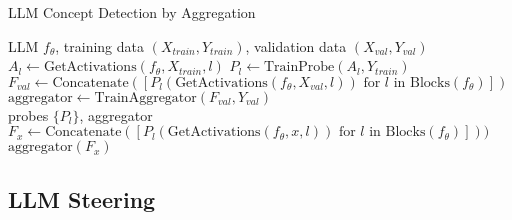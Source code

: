 \begin{algorithm}[h]
\caption{LLM Concept Detection by Aggregation}
\label{alg: aggregation}
\begin{algorithmic}[1]
\Require LLM $f_\theta$, training data $(X_{train}, Y_{train})$, validation data $(X_{val}, Y_{val})$
        \State $A_l \gets \text{GetActivations}(f_\theta, X_{train}, l)$
        \State $P_l \gets \text{TrainProbe}(A_l, Y_{train})$ 
    \EndFor
    \State $F_{val} \gets \text{Concatenate}([P_l(\text{GetActivations}(f_\theta, X_{val}, l)) \text{ for } l \text{ in Blocks}(f_\theta)])$
    \State $\text{aggregator} \gets \text{TrainAggregator}(F_{val}, Y_{val})$\\
    \Return probes $\{P_l\}$, aggregator
\EndProcedure\\
    \State $F_x \gets \text{Concatenate}([P_l(\text{GetActivations}(f_\theta, x, l)) \text{ for } l \text{ in Blocks}(f_\theta)]))$\\
    \Return $\text{aggregator}(F_x)$
\EndProcedure
\end{algorithmic}
\end{algorithm}






\subsection{LLM Steering}
